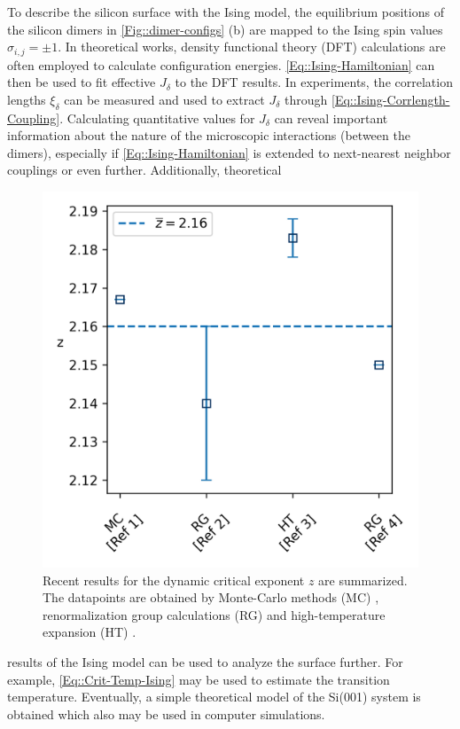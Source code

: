 	To describe the silicon surface with the Ising model, the equilibrium positions of the silicon dimers in \autoref{Fig::dimer-configs} (b) are mapped to the Ising spin values $\sigma_{i ,j} =	\pm 1$. In theoretical works, density functional theory (DFT) calculations are often employed to calculate configuration energies.   \autoref{Eq::Ising-Hamiltonian} can then be used to fit effective  $J_\delta$ to the DFT results. In experiments, the correlation lengths $\xi_\delta$ can be measured and used to extract $J_\delta$ through \autoref{Eq::Ising-Corrlength-Coupling}. Calculating quantitative values for $J_\delta$ can reveal important information about the nature of the microscopic interactions (between the dimers), especially if \autoref{Eq::Ising-Hamiltonian} is extended to next-nearest neighbor couplings or even further. Additionally, theoretical
	\begin{figure}
		\includegraphics[width=\linewidth]{graphics/z-values}
		\caption{Recent results for the dynamic critical exponent $z$ are summarized. The datapoints are obtained by Monte-Carlo methods (MC) \cite{nightingale2000monte}, renormalization group calculations (RG) \cite{adzhemyan2022dynamic, duclut2017frequency} and high-temperature expansion (HT) \cite{dammann1993dynamical}.}
		\label{Figure::Ising-z-values}
	\end{figure}
	results of the Ising model can be used to analyze the surface further. For example, \autoref{Eq::Crit-Temp-Ising} may be used to estimate the transition temperature. Eventually, a simple theoretical model of the Si(001) system is obtained which also may be used in computer simulations.\\
	
